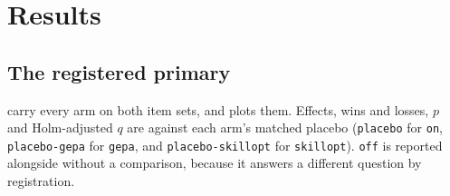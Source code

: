 \section{Results}
\label{sec:results}

%

\subsection{The registered primary}

 carry every arm on both item sets, and
 plots them. Effects, wins and losses, $p$ and Holm-adjusted
$q$ are against each arm's matched placebo (\texttt{placebo} for \texttt{on},
\texttt{placebo-gepa} for \texttt{gepa}, and \texttt{placebo-skillopt} for
\texttt{skillopt}). \texttt{off} is reported alongside without a comparison,
because it answers a different question by registration.

\begin{table}[htbp]
\centering
\unseenTable
\caption{Unseen set: \NUM{\templatesUnseen} held-out templates, three holdout seeds,
\NUM{\unseenItems} items. Neither engine saw these templates at any seed.}
\label{tab:unseen}
\end{table}

\begin{table}[htbp]
\centering
\seenTable
\caption{Seen set: \NUM{\templatesSeen} trained templates, two holdout seeds,
\NUM{\seenItems} items. The templates were visible to both searches; these
items were not, and were minted after both winners were frozen.}
\label{tab:seen}
\end{table}

